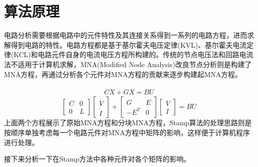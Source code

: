 \documentclass[12pt]{article}
\begin{document}
\section{算法原理} \label{sec:2}

\qquad 电路分析需要根据电路中的元件特性及其连接关系得到一系列的电路方程，进而求解得到电路的特性。电路方程都是基于基尔霍夫电压定律(KVL)、基尔霍夫电流定律(KCL)和电路元件自身的电流电压方程所构建的。传统的节点电压法和回路电流法不适用于计算机求解，MNA(Modified Node Analysis)改良节点分析则是构建了MNA方程，再通过分析各个元件对MNA方程的贡献来逐步构建起MNA方程。\par

\begin{gather*}
  C \dot{X}+G X=B U
  \end{gather*}
\begin{equation*}
  \left[\begin{array}{ll}
  C & 0 \\
  0 & L
  \end{array}\right]\left[\begin{array}{l}
  \dot{V} \\
  \dot{I}
  \end{array}\right]+\left[\begin{array}{cc}
  G & E \\
  -E^T & 0
  \end{array}\right]\left[\begin{array}{l}
  V \\
  I
  \end{array}\right]=B U
\end{equation*}
\qquad 上面两个方程展示了原始MNA方程和分块MNA方程，Stamp算法的处理思路则是按顺序单独考虑每一个电路元件对MNA方程中矩阵的影响，这样便于计算机程序进行处理。\par
\qquad 接下来分析一下在Stamp方法中各种元件对各个矩阵的影响。\par
\end{document}
